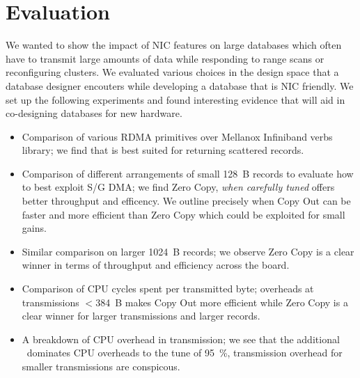 \section{Evaluation}
We wanted to show the impact of NIC features on large databases which often have to 
transmit large amounts of data while responding to range scans or reconfiguring clusters. 
We evaluated various choices in the design space that a database designer encouters while developing 
a database that is NIC friendly. We set up the following experiments and found interesting 
evidence that will aid in co-designing databases for new hardware.
\begin{itemize}
\item Comparison of various RDMA primitives over Mellanox Infiniband verbs library; we find that  is best suited for returning scattered records.
\item Comparison of different arrangements of small 128~B records to evaluate how to best exploit S/G DMA; we find Zero Copy, {\em when carefully tuned} offers better throughput and efficency. We outline precisely when Copy Out can be faster 
and more efficient than Zero Copy which could be exploited for small gains.
\item Similar comparison on larger 1024~B records; we observe Zero Copy is a clear winner in terms of throughput and efficiency across the board.
\item Comparison of CPU cycles spent per transmitted byte; overheads at transmissions $<$384~B makes Copy Out more efficient while Zero Copy is a clear winner for larger transmissions and larger records.
\item A breakdown of CPU overhead in transmission; we see that the additional \memcpy ~dominates CPU overheads to the tune of 95~\%, transmission overhead for smaller transmissions are conspicous.
\end{itemize}



